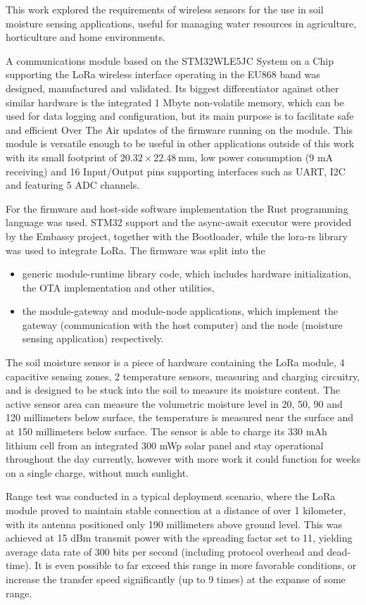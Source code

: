 
This work explored the requirements of wireless sensors for the use in soil moisture sensing applications, useful for managing water resources in agriculture, horticulture and home environments.

A communications module based on the STM32WLE5JC System on a Chip supporting the LoRa wireless interface operating in the EU868 band was designed, manufactured and validated. Its biggest differentiator against other similar hardware is the integrated 1 Mbyte non-volatile memory, which can be used for data logging and configuration, but its main purpose is to facilitate safe and efficient Over The Air updates of the firmware running on the module. This module is versatile enough to be useful in other applications outside of this work with its small footprint of $20.32 \times 22.48~\mathrm{mm}$, low power consumption (9 mA receiving) and 16 Input/Output pins supporting interfaces such as UART, I2C and featuring 5 ADC channels.

For the firmware and host-side software implementation the Rust programming language was used. STM32 support and the async-await executor were provided by the Embassy project, together with the Bootloader, while the lora-rs library was used to integrate LoRa. The firmware was split into the 
\begin{itemize}
    \item generic module-runtime library code, which includes hardware initialization, the OTA implementation and other utilities,
    \item the module-gateway and module-node applications, which implement the gateway (communication with the host computer) and the node (moisture sensing application) respectively.
\end{itemize}

The soil moisture sensor is a piece of hardware containing the LoRa module, 4 capacitive sensing zones, 2 temperature sensors, measuring and charging circuitry, and is designed to be stuck into the soil to measure its moisture content. The active sensor area can measure the volumetric moisture level in 20, 50, 90 and 120 millimeters below surface, the temperature is measured near the surface and at 150 millimeters below surface. The sensor is able to charge its 330 mAh lithium cell from an integrated 300 mWp solar panel and stay operational throughout the day currently, however with more work it could function for weeks on a single charge, without much sunlight.

Range test was conducted in a typical deployment scenario, where the LoRa module proved to maintain stable connection at a distance of over 1 kilometer, with its antenna positioned only 190 millimeters above ground level. This was achieved at 15 dBm transmit power with the spreading factor set to 11, yielding average data rate of 300 bits per second (including protocol overhead and dead-time). It is even possible to far exceed this range in more favorable conditions, or increase the transfer speed significantly (up to 9 times) at the expanse of some range.
